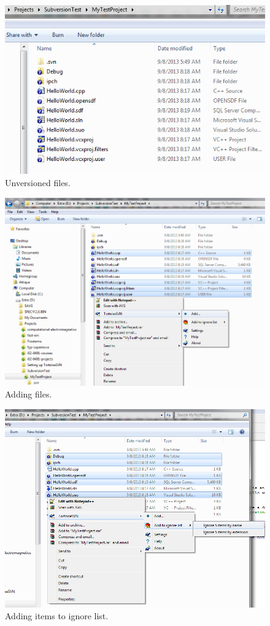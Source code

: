 \documentclass[12pt,a4paper]{article}
\begin{document}
\begin{figure}[H]
\centering
\includegraphics[scale=0.75]{UnversionedFiles.png}
\caption{Unversioned files.}
\label{unversioned-files}
\end{figure}
\begin{figure}[H]
\centering
\includegraphics[scale=0.7]{AddingFiles.png}
\caption{Adding files.}
\label{adding-files}
\end{figure}
\begin{figure}[H]
\centering
\includegraphics[scale=0.7]{IgnoringFiles.png}
\caption{Adding items to ignore list.}
\label{ignoring-files}
\end{figure}
\end{document}
